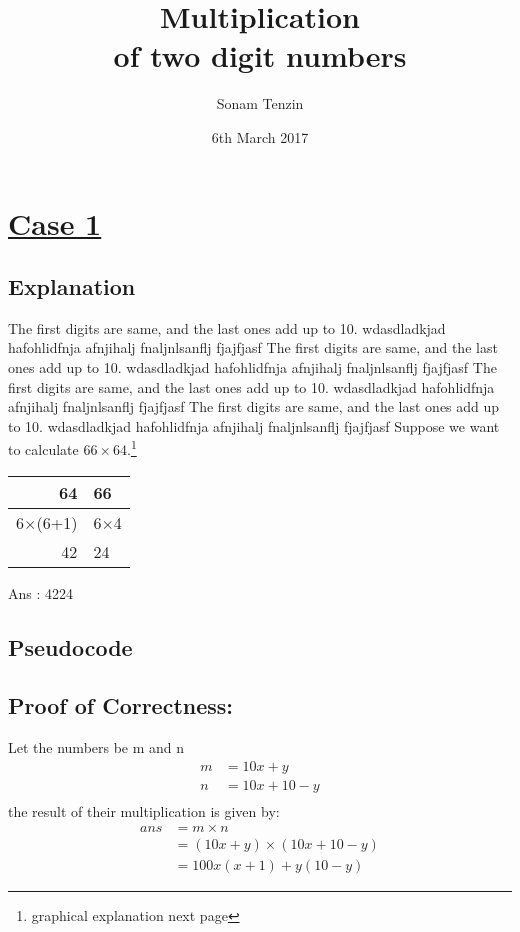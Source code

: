\documentclass[11pt, a4paper]{article}
\title{Multiplication \\of two digit numbers}
\author{Sonam Tenzin}
\date{6th March 2017}
\begin{document}
	\maketitle
	\newpage
	\section{\underline{Case 1}}
	\subsection{Explanation}
	The first digits are same, and the last ones add up to 10. wdasdladkjad hafohlidfnja afnjihalj fnaljnlsanflj  fjajfjasf The first digits are same, and the last ones add up to 10. wdasdladkjad hafohlidfnja afnjihalj fnaljnlsanflj  fjajfjasf The first digits are same, and the last ones add up to 10. wdasdladkjad hafohlidfnja afnjihalj fnaljnlsanflj  fjajfjasf The first digits are same, and the last ones add up to 10. wdasdladkjad hafohlidfnja afnjihalj fnaljnlsanflj  fjajfjasf
	Suppose we want to calculate $66 \times 64$.\footnote{graphical explanation next page}\\
	

	{\begin{center}
	\begin{tabular}{rl}
		64 & 66\\
		\hline
		 6$\times$(6+1) & 6$\times$4\\
		 42 & 24\\
		 
	\end{tabular}
	\end{center}}
	Ans : 4224
		
	\subsection{Pseudocode}\label{B1}
	\begin{algorithm}
		{}
	\end{algorithm}
		
	\subsection{Proof of Correctness:\label{C1}\\}
	Let the numbers be m and n
	\begin{align*}
		m &= 10x+y\\%
		n &= 10x+10-y\\%
	\end{align*}
	the result of their multiplication is given by:\\
	\begin{align*}
		ans &= m \times n\\
				&= (10x+y) \times (10x +10-y)\\
				&= 100x(x+1) + y(10-y) 
	\end{align*}
	
	
\end{document}
